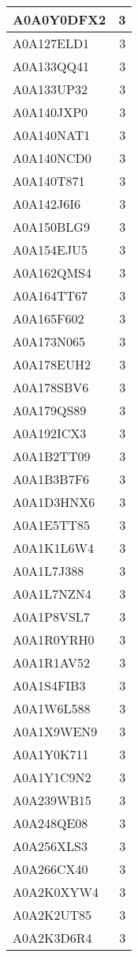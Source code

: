 \documentclass[
]{book}
\theoremstyle{definition}
\theoremstyle{definition}
\theoremstyle{definition}
\theoremstyle{definition}
\theoremstyle{remark}
\begin{document}
\begin{table}
\begin{tabular}{l|r}
\hline
A0A0Y0DFX2 & 3\\
\hline
A0A127ELD1 & 3\\
\hline
A0A133QQ41 & 3\\
\hline
A0A133UP32 & 3\\
\hline
A0A140JXP0 & 3\\
\hline
A0A140NAT1 & 3\\
\hline
A0A140NCD0 & 3\\
\hline
A0A140T871 & 3\\
\hline
A0A142J6I6 & 3\\
\hline
A0A150BLG9 & 3\\
\hline
A0A154EJU5 & 3\\
\hline
A0A162QMS4 & 3\\
\hline
A0A164TT67 & 3\\
\hline
A0A165F602 & 3\\
\hline
A0A173N065 & 3\\
\hline
A0A178EUH2 & 3\\
\hline
A0A178SBV6 & 3\\
\hline
A0A179QS89 & 3\\
\hline
A0A192ICX3 & 3\\
\hline
A0A1B2TT09 & 3\\
\hline
A0A1B3B7F6 & 3\\
\hline
A0A1D3HNX6 & 3\\
\hline
A0A1E5TT85 & 3\\
\hline
A0A1K1L6W4 & 3\\
\hline
A0A1L7J388 & 3\\
\hline
A0A1L7NZN4 & 3\\
\hline
A0A1P8VSL7 & 3\\
\hline
A0A1R0YRH0 & 3\\
\hline
A0A1R1AV52 & 3\\
\hline
A0A1S4FIB3 & 3\\
\hline
A0A1W6L588 & 3\\
\hline
A0A1X9WEN9 & 3\\
\hline
A0A1Y0K711 & 3\\
\hline
A0A1Y1C9N2 & 3\\
\hline
A0A239WB15 & 3\\
\hline
A0A248QE08 & 3\\
\hline
A0A256XLS3 & 3\\
\hline
A0A266CX40 & 3\\
\hline
A0A2K0XYW4 & 3\\
\hline
A0A2K2UT85 & 3\\
\hline
A0A2K3D6R4 & 3\\

\end{tabular}
\end{table}
\end{document}

